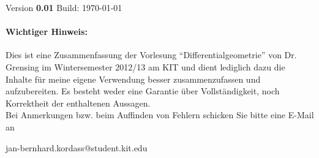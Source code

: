 \documentclass[a4paper, twoside, 11pt]{scrartcl}
\begin{document}

\vspace{0.5cm}

Version \textbf{0.01} \quad Build: \today

\paragraph{Wichtiger Hinweis:}
Dies ist eine Zusammenfassung der Vorlesung "`Differentialgeometrie"' von Dr. Grensing im Wintersemester 2012/13 am KIT und dient lediglich dazu die Inhalte für meine eigene Verwendung besser zusammenzufassen und aufzubereiten. Es besteht weder eine Garantie über Vollständigkeit, noch Korrektheit der enthaltenen Aussagen.\\

Bei Anmerkungen bzw. beim Auffinden von Fehlern schicken Sie bitte eine E-Mail an
\begin{center}
  jan-bernhard.kordass@student.kit.edu
\end{center}



\printindex
\end{document}
